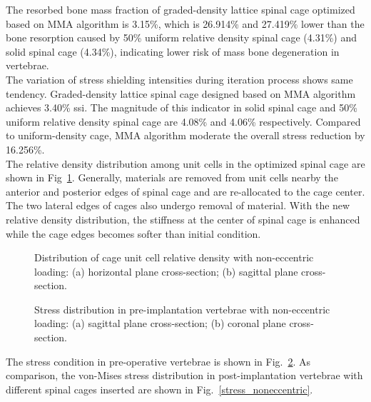 \documentclass[12pt]{extbook}
\begin{document}
The resorbed bone mass fraction of graded-density lattice spinal cage optimized based on MMA algorithm is 3.15\%, which is 26.914\% and 27.419\% lower than the bone resorption caused by 50\% uniform relative density spinal cage (4.31\%) and solid spinal cage (4.34\%), indicating lower risk of mass bone degeneration in vertebrae.\\

The variation of stress shielding intensities during iteration process shows same tendency. Graded-density lattice spinal cage designed based on MMA algorithm achieves 3.40\% ssi. The magnitude of this indicator in solid spinal cage and 50\% uniform relative density spinal cage are 4.08\% and 4.06\% respectively. Compared to uniform-density cage, MMA algorithm moderate the overall stress reduction by 16.256\%.\\

The relative density distribution among unit cells in the optimized spinal cage are shown in Fig~\ref{density_noneccentric}. Generally, materials are removed from unit cells nearby the anterior and posterior edges of spinal cage and are re-allocated to the cage center. The two lateral edges of cages also undergo removal of material. With the new relative density distribution, the stiffness at the center of spinal cage is enhanced while the cage edges becomes softer than initial condition.\\

\begin{figure}[htbp]
\centering
{}
\caption{Distribution of cage unit cell relative density with non-eccentric loading: (a) horizontal plane cross-section; (b) sagittal plane cross-section.}
\label{density_noneccentric}
\end{figure}

\begin{figure}[htbp]
\centering
{}
\caption{Stress distribution in pre-implantation vertebrae with non-eccentric loading: (a) sagittal plane cross-section; (b) coronal plane cross-section.}
\label{ref_noneccentric}
\end{figure}
The stress condition in pre-operative vertebrae is shown in Fig.~\ref{ref_noneccentric}. As comparison, the von-Mises stress distribution in post-implantation vertebrae with different spinal cages inserted are shown in Fig.~\ref{stress_noneccentric}.\\
\end{document}
